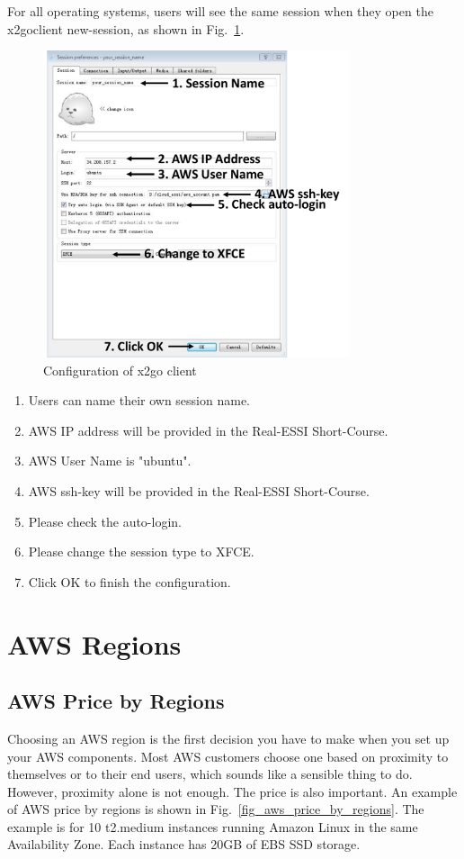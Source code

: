 For all operating systems, users will see the same session when they
open the x2goclient new-session, as shown in Fig.~\ref{fig_x2go_client}.

\begin{figure}[H]
  \centering
  \includegraphics[width = 9cm]{./Figure-files/overview/login_windows_x2go.pdf}
  \caption{Configuration of x2go client}
  \label{fig_x2go_client}
\end{figure}

\begin{enumerate}
	\item Users can name their own session name.
	\item AWS IP address will be provided in the Real-ESSI Short-Course.
	\item AWS User Name is "ubuntu".
	\item AWS ssh-key will be provided in the Real-ESSI Short-Course.
	\item Please check the auto-login.
	\item Please change the session type to XFCE.
	\item Click OK to finish the configuration.
\end{enumerate}

\section{AWS Regions}

\subsection{AWS Price by Regions}
Choosing an AWS region is the first decision you have to make when you set up 
your AWS components. Most AWS customers choose one based on proximity to 
themselves or to their end users, which sounds like a sensible thing to do.
However, proximity alone is not enough.
The price is also important. 
An example of AWS price by regions is shown in Fig.~\ref{fig_aws_price_by_regions}. 
The example is for 10 t2.medium instances running Amazon Linux in the same 
Availability Zone. Each instance has 20GB of EBS SSD storage. 

